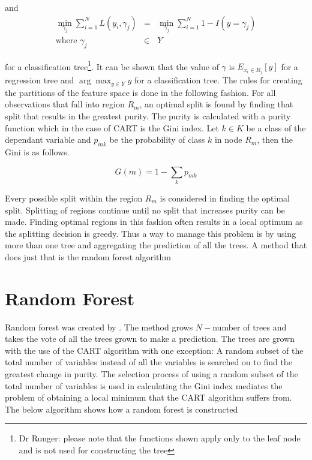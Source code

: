 and 
\begin{equation}
	\begin{array}{rcl}
		 \min_{\gamma_j} \sum_{i=1}^N L(y_i,\gamma_j) & = &  \min_{\gamma_j} \sum_{i=1}^N 1-I(y=\gamma_j) \\
	\mbox{where }	\gamma_j &\in & Y
	\end{array}
\end{equation}

 
for a classification tree\footnote{Dr Runger: please note that the functions shown apply only to the leaf node and is not used for constructing the tree}. It can be shown that the value of $\gamma$ is $E_{x_i \in R_j}[y]$ for a regression tree and $\arg\max_{y\in Y} y$ for a classification tree. The rules for creating the partitions of the feature space is done in the following fashion. For all observations that fall into region $R_m$, an optimal split is found by finding that split that results in the greatest purity. The purity is calculated with a purity function which in the case of CART is the Gini index. Let $k \in K$ be a class of the dependant variable and $p_{mk}$ be the probability of class $k$ in node $R_m$, then the Gini is as follows.

\begin{equation}
	G(m)= 1-\displaystyle\sum_k p_{mk}
\end{equation}

Every possible split within the region $R_m$ is considered in finding the optimal split. Splitting of regions continue until no split that increases purity can be made. Finding optimal regions in this fashion often results in a local optimum as the splitting decision is greedy. Thus a way to manage this problem is by using more than one tree and aggregating the prediction of all the trees. A method that does just that is the random forest algorithm

\section{Random Forest}
Random forest was created by \citet{Breiman01}. The method grows $N-$number of trees and takes the vote of all the trees grown to make a prediction. The trees are grown with the use of the CART algorithm with one exception: A random subset of the total number of variables instead of all the variables is searched on to find the greatest change in purity. The selection process of using a random subset of the total number of variables is used in calculating the Gini index mediates the problem of obtaining a local minimum that the CART algorithm suffers from. The below algorithm shows how a random forest is constructed

